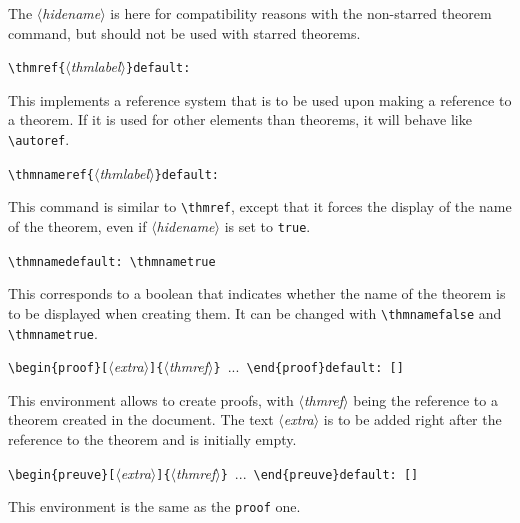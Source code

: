 \documentclass[12pt, babellanguage=british, titlespace, defaulttheorems]{altarticle}
\newcommand{\aargt}[1]{\ensuremath{\langle}\textrm{{\emph{#1}}}\ensuremath{\rangle}}
\newcommand{\argt}[1]{\texttt{\{}\ensuremath{\langle}\textrm{{\emph{#1}}}\ensuremath{\rangle}\texttt{\}}}
\newcommand{\optargt}[1]{\texttt{[}\ensuremath{\langle}\textrm{\emph{#1}}\ensuremath{\rangle}\texttt{]}}
\newcommand{\commandline}[1][]{\def\argI{#1}\ccommandline}
\newcommand{\ccommandline}[2][]{\par\medskip\hspace*{-.75cm}\texttt{\textbackslash#2}\argI{}\hfill\if\relax\detokenize{#1}\relax\else\texttt{default:~#1}\fi\par}
\newcommand{\envline}[1][]{\def\argI{#1}\eenvline}
\newcommand{\eenvline}[2][]{\par\medskip\hspace*{-.75cm}\texttt{\textbackslash begin\{#2\}}\argI{}~...~\texttt{\textbackslash end\{#2\}}\hfill\if\relax\detokenize{#1}\relax\else\texttt{default:~#1}\fi\par}
\begin{document}
The \aargt{hidename} is here for compatibility reasons with the non-starred theorem command, but should not be used with starred theorems.
\commandline[\argt{thmlabel}]{thmref}This implements a reference system that is to be used upon making a reference to a theorem. If it is used for other elements than theorems, it will behave like \texttt{\textbackslash autoref}.
\commandline[\argt{thmlabel}]{thmnameref}This command is similar to \texttt{\textbackslash thmref}, except that it forces the display of the name of the theorem, even if \aargt{hidename} is set to \texttt{true}.
\commandline[][\textbackslash thmnametrue]{thmname}This corresponds to a boolean that indicates whether the name of the theorem is to be displayed when creating them. It can be changed with \texttt{\textbackslash thmnamefalse} and \texttt{\textbackslash thmnametrue}.
\envline[\optargt{extra}\argt{thmref}][{[]}]{proof}This environment allows to create proofs, with \aargt{thmref} being the reference to a theorem created in the document. The text \aargt{extra} is to be added right after the reference to the theorem and is initially empty.
\envline[\optargt{extra}\argt{thmref}][{[]}]{preuve}This environment is the same as the \texttt{proof} one.
\end{document}

